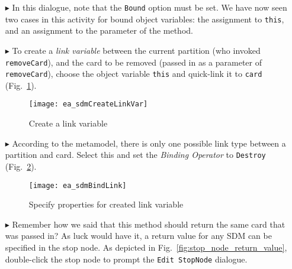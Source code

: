 \begin{itemize}
\vspace{0.5cm}

\item[$\blacktriangleright$] In this dialogue, note that the \texttt{Bound} option must be set. We have now seen two cases in this activity for bound object
variables: the assignment to \texttt{this}, and an assignment to the parameter of the method.

\vspace{0.5cm}

\item[$\blacktriangleright$] To create a \emph{link variable} between the current partition (who invoked \texttt{removeCard}), and the
card to be removed (passed in as a parameter of \texttt{removeCard}), choose the object variable \texttt{this} and quick-link it to \texttt{card}
(Fig.~\ref{fig:link_variable}).

\begin{figure}[htpb]
\begin{center}
  \texttt{[image: ea\_sdmCreateLinkVar]}
  \caption{Create a link variable}   
  \label{fig:link_variable}
\end{center}
\end{figure}

\item[$\blacktriangleright$] According to the metamodel, there is only one possible link type between a partition and card. Select this and set the
\emph{Binding Operator} to \texttt{Destroy} (Fig.~\ref{fig:link_variable_properties}). 

\vspace{0.5cm}

\begin{figure}[h!]
\begin{center} 
 \texttt{[image: ea\_sdmBindLink]}
  \caption{Specify properties for created link variable}  
  \label{fig:link_variable_properties}
\end{center}
\end{figure}

\vspace{0.5cm}

\item[$\blacktriangleright$] Remember how we said that this method should return the same card that was passed in? As luck would have it, a return value for any
SDM can be specified in the stop node. As depicted in Fig.~\ref{fig:stop_node_return_value}, double-click the stop node to prompt the \texttt{Edit StopNode} dialogue. 


\end{itemize}
